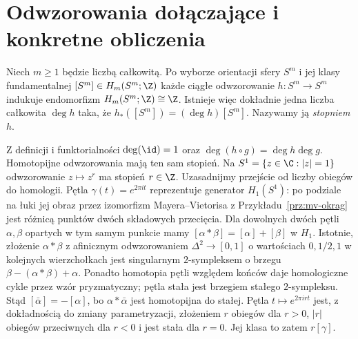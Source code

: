 \section{Odwzorowania dołączające i konkretne obliczenia}
\label{sec:obliczenia-homologii}

\begin{definicja}
\label{def:stopien-sfer}
Niech $m\geq1$ będzie liczbą całkowitą.
Po wyborze orientacji sfery $S^m$ i jej
klasy fundamentalnej $[S^m]\in H_m(S^m;\Z)$
każde ciągłe odwzorowanie $h:S^m\to S^m$
indukuje endomorfizm $H_m(S^m;\Z)\cong\Z$.
Istnieje więc dokładnie jedna
liczba całkowita $\deg h$ taka,
że $h_*([S^m])=(\deg h)[S^m]$.
Nazywamy ją \emph{stopniem} $h$.
\end{definicja}

Z definicji i funktorialności
$\deg(\id)=1$ oraz
$\deg(h\circ g)=\deg h\deg g$.
Homotopijne odwzorowania mają ten sam
stopień. Na $S^1=\{z\in\C:|z|=1\}$
odwzorowanie $z\mapsto z^r$ ma stopień $r\in\Z$.
Uzasadnijmy przejście od liczby obiegów do homologii.
Pętla $\gamma(t)=e^{2\pi it}$ reprezentuje generator $H_1(S^1)$:
po podziale na łuki jej obraz przez izomorfizm Mayera--Vietorisa
z Przykładu~\ref{prz:mv-okrag} jest różnicą punktów dwóch składowych przecięcia.
Dla dowolnych dwóch pętli $\alpha,\beta$ opartych w tym samym punkcie
mamy $[\alpha*\beta]=[\alpha]+[\beta]$ w $H_1$.
Istotnie, złożenie $\alpha*\beta$ z afinicznym odwzorowaniem
$\Delta^2\to[0,1]$ o wartościach $0,1/2,1$ w kolejnych wierzchołkach
jest singularnym $2$-sympleksem o brzegu
$\beta-(\alpha*\beta)+\alpha$.
Ponadto homotopia pętli względem końców daje homologiczne cykle
przez wzór pryzmatyczny; pętla stała jest brzegiem stałego $2$-sympleksu.
Stąd $[\bar\alpha]=-[\alpha]$, bo $\alpha*\bar\alpha$ jest
homotopijna do stałej. Pętla $t\mapsto e^{2\pi irt}$ jest,
z dokładnością do zmiany parametryzacji, złożeniem $r$ obiegów dla $r>0$,
$|r|$ obiegów przeciwnych dla $r<0$
i jest stała dla $r=0$. Jej klasa to zatem $r[\gamma]$.

